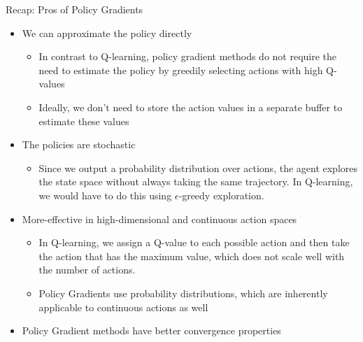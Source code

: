\documentclass[aspectratio=169]{../latex_main/tntbeamer}  %
\begin{document}
\begin{frame}[c]{Recap: Pros of Policy Gradients}
	
\begin{itemize}
    \item We can approximate the policy directly
    \begin{itemize}
        \item In contrast to Q-learning, policy gradient methods do not require the need to estimate the policy by greedily selecting actions with high Q-values
        \item Ideally, we don't need to store the action values in a separate buffer to estimate these values
    \end{itemize}
    \pause
    \item The policies are stochastic
    \begin{itemize}
        \item Since we output a probability distribution over actions, the agent explores the state space without always taking the same trajectory. In Q-learning, we would have to do this using $\epsilon$-greedy exploration.
    \end{itemize}
    \pause
    \item More-effective in high-dimensional and continuous action spaces
    \begin{itemize}
        \item In Q-learning, we assign a Q-value to each possible action and then take the action that has the maximum value, which does not scale well with the number of actions. \item Policy Gradients use probability distributions, which are inherently applicable to continuous actions as well
    \end{itemize}
    \pause
    \item Policy Gradient methods have better convergence properties
\end{itemize}
	
\end{frame}
\end{document}
